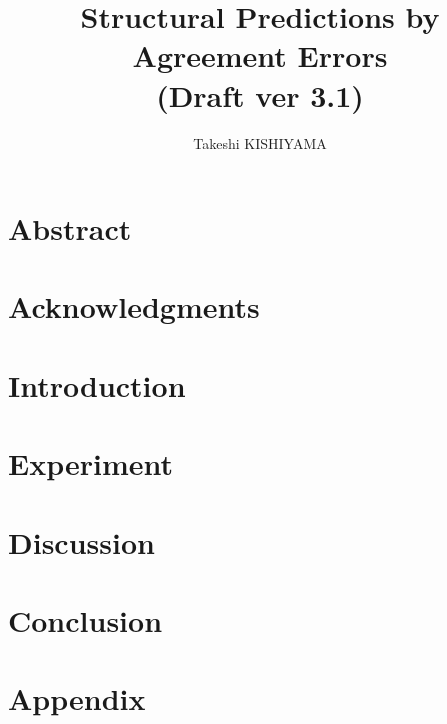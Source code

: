 \documentclass[dvipdfmx,12pt,a4paper,openany]{book}
\begin{document}
\title{Structural Predictions by Agreement Errors\\
(Draft ver 3.1)}
\author{Takeshi KISHIYAMA}
\maketitle

\frontmatter
\chapter{Abstract}

\chapter{Acknowledgments}

\tableofcontents

\mainmatter
\chapter{Introduction}

\chapter{Experiment}

\chapter{Discussion}

\chapter{Conclusion}




\backmatter
\chapter{Appendix}

\end{document}
